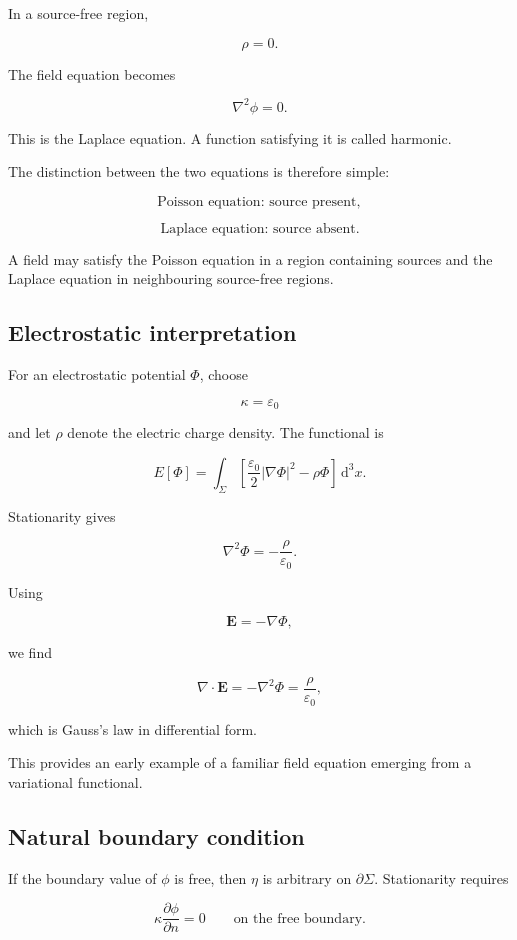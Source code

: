 In a source-free region,

\[
\rho=0.
\]

The field equation becomes

\[
\boxed{
\nabla^{2}\phi=0
}.
\]

This is the Laplace equation. A function satisfying it is called harmonic.

The distinction between the two equations is therefore simple:

\[
\text{Poisson equation: source present},
\]

\[
\text{Laplace equation: source absent}.
\]

A field may satisfy the Poisson equation in a region containing sources and the Laplace equation in neighbouring source-free regions.

\subsection{Electrostatic interpretation}

For an electrostatic potential \(\Phi\), choose

\[
\kappa=\varepsilon_{0}
\]

and let \(\rho\) denote the electric charge density. The functional is

\[
E[\Phi]
=
\int_{\Sigma}
\left[
\frac{\varepsilon_{0}}{2}|\nabla\Phi|^{2}
-
\rho\Phi
\right]
\,\mathrm{d}^{3}x.
\]

Stationarity gives

\[
\boxed{
\nabla^{2}\Phi
=
-\frac{\rho}{\varepsilon_{0}}
}.
\]

Using

\[
\mathbf{E}=-\nabla\Phi,
\]

we find

\[
\nabla\cdot\mathbf{E}
=
-\nabla^{2}\Phi
=
\frac{\rho}{\varepsilon_{0}},
\]

which is Gauss's law in differential form.

This provides an early example of a familiar field equation emerging from a variational functional.

\subsection{Natural boundary condition}

If the boundary value of \(\phi\) is free, then \(\eta\) is arbitrary on \(\partial\Sigma\). Stationarity requires

\[
\boxed{
\kappa
\frac{\partial\phi}{\partial n}
=0
\qquad
\text{on the free boundary}
}.
\]

